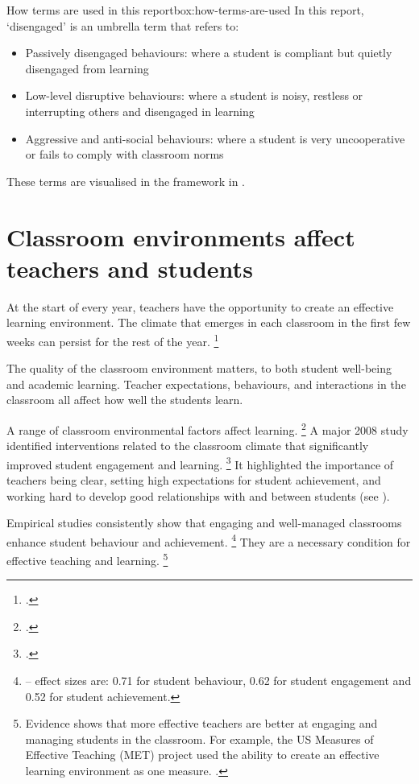 \documentclass[FrontPage]{grattan}
\begin{document}
\begin{addsmallbox}{How terms are used in this report}{box:how-terms-are-used}
In this report, `disengaged' is an umbrella term that refers to:
\begin{itemize}[leftmargin=1em]
    \item Passively disengaged behaviours: where a student is compliant but quietly disengaged from learning
    \item Low-level disruptive behaviours: where a student is noisy, restless or interrupting others and disengaged in learning
    \item Aggressive and anti-social behaviours: where a student is very uncooperative or fails to comply with classroom norms
\end{itemize}
These terms are visualised in the framework in .
\end{addsmallbox}

\section{Classroom environments affect teachers and students}\label{sec:classroom-environments-affect-teachers-students}
At the start of every year, teachers have the opportunity to create an effective learning environment. The climate that emerges in each classroom in the first few weeks can persist for the rest of the year.%
    \footcites{Marzano2003ClassroomManagementWorks}{Rogers2015ClassroomBehaviourPractical}

The quality of the classroom environment matters, to both student well-being and academic learning. Teacher expectations, behaviours, and interactions in the classroom all affect how well the students learn.

A range of classroom environmental factors affect learning.%
    \footcites{Hattie2008visiblelearningsynthesis}{Marzano2003ClassroomManagementWorks}{Oliver2011TeacherClassroomManagement}{Simonsen2008EvidenceBasedPractices}
A major 2008 study identified interventions related to the classroom climate that significantly improved student engagement and learning.%
    \footcite{Hattie2008visiblelearningsynthesis}
It highlighted the importance of teachers being clear, setting high expectations for student achievement, and working hard to develop good relationships with and between students (see ). 

Empirical studies consistently show that engaging and well-managed classrooms enhance student behaviour and achievement.%
    \footnote{\textcites{Marzano2003ClassroomManagementWorks}{Oliver2011TeacherClassroomManagement} -- effect sizes are: 0.71 for student behaviour, 0.62 for student engagement and 0.52 for student achievement.} 
They are a necessary condition for effective teaching and learning.%
    \footnote{Evidence shows that more effective teachers are better at engaging and managing students in the classroom. For example, the US Measures of Effective Teaching (MET) project used the ability to create an effective learning environment as one measure. \textcite{Kane2010LearningAboutTeaching}.}
\end{document}
